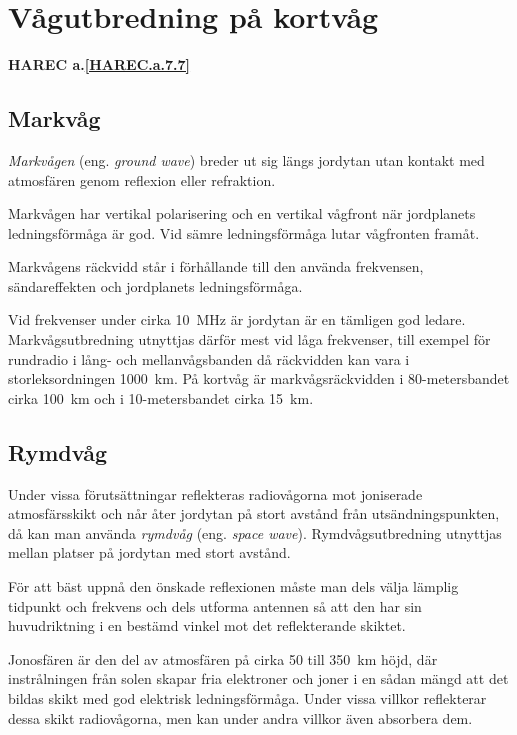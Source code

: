 \section{Vågutbredning på kortvåg}
\textbf{
HAREC a.\ref{HAREC.a.7.7}\label{myHAREC.a.7.7}
}

\subsection{Markvåg}

\emph{Markvågen} (eng. \emph{ground wave}) breder ut sig längs jordytan utan
kontakt med atmosfären genom reflexion eller refraktion.

Markvågen har vertikal polarisering och en vertikal vågfront när jordplanets
ledningsförmåga är god.
Vid sämre ledningsförmåga lutar vågfronten framåt.

Markvågens räckvidd står i förhållande till den använda frekvensen,
sändareffekten och jordplanets ledningsförmåga.

Vid frekvenser under cirka 10~MHz är jordytan är en tämligen god ledare.
Markvågsutbredning utnyttjas därför mest vid låga frekvenser, till exempel för
rundradio i lång- och mellanvågsbanden då räckvidden kan vara i
storleksordningen 1000~km.
På kortvåg är markvågsräckvidden i 80-metersbandet cirka 100~km och i
10-metersbandet cirka 15~km.

\subsection{Rymdvåg}

Under vissa förutsättningar reflekteras radiovågorna mot joniserade
atmosfärsskikt och når åter jordytan på stort avstånd från utsändningspunkten,
då kan man använda \emph{rymdvåg} (eng. \emph{space wave}).
Rymdvågsutbredning utnyttjas mellan platser på jordytan med stort avstånd.

För att bäst uppnå den önskade reflexionen måste man dels välja
lämplig tidpunkt och frekvens och dels utforma antennen så att den har
sin huvudriktning i en bestämd vinkel mot det reflekterande skiktet.

Jonosfären är den del av atmosfären på cirka 50 till 350~km höjd, där
instrålningen från solen skapar fria elektroner och joner i en sådan
mängd att det bildas skikt med god elektrisk ledningsförmåga.
Under vissa villkor reflekterar dessa skikt radiovågorna, men kan under
andra villkor även absorbera dem.

